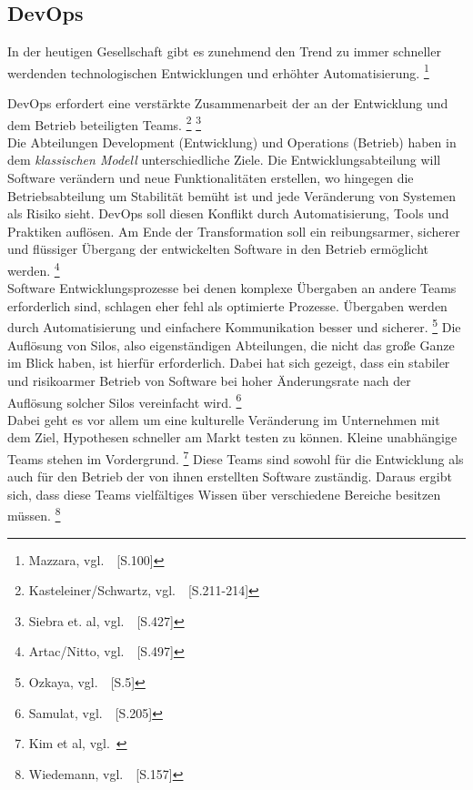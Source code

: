 \subsection{DevOps}\label{devops}

In der heutigen Gesellschaft gibt es zunehmend den Trend zu immer
schneller werdenden technologischen Entwicklungen und erhöhter Automatisierung. \footnote{Mazzara, vgl.~\cite{Mazzara2019}~[S.100]}

DevOps erfordert eine verstärkte Zusammenarbeit der an der Entwicklung und dem Betrieb beteiligten Teams.
\footnote{Kasteleiner/Schwartz, vgl.~\cite{Kasteleiner2019}~[S.211-214]}
\footnote{Siebra et. al, vgl.~\cite{Siebra2019}~[S.427]} \\

Die Abteilungen Development (Entwicklung) und Operations (Betrieb) haben in dem \textsl{klassischen Modell} unterschiedliche Ziele.
Die Entwicklungsabteilung will Software verändern und neue Funktionalitäten erstellen,
wo hingegen die Betriebsabteilung um Stabilität bemüht ist und jede Veränderung von Systemen als Risiko sieht.
DevOps soll diesen Konflikt durch Automatisierung, Tools und Praktiken auflösen.
Am Ende der Transformation soll ein reibungsarmer, sicherer und flüssiger Übergang der entwickelten Software in den Betrieb ermöglicht werden.
\footnote{Artac/Nitto, vgl.~\cite{Artac2017}~[S.497]} \\

Software Entwicklungsprozesse bei denen komplexe Übergaben an andere Teams erforderlich sind, schlagen eher fehl als optimierte Prozesse.
Übergaben werden durch Automatisierung und einfachere Kommunikation besser und sicherer. \footnote{Ozkaya, vgl.~\cite{Ozkaya2019}~[S.5]}
Die Auflösung von Silos, also eigenständigen Abteilungen, die nicht das große Ganze im Blick haben, ist hierfür erforderlich.
Dabei hat sich gezeigt, dass ein stabiler und risikoarmer Betrieb von Software bei hoher Änderungsrate nach der Auflösung solcher Silos vereinfacht wird.
\footnote{Samulat, vgl.~\cite{Samulat2017}~[S.205]} \\

Dabei geht es vor allem um eine kulturelle Veränderung im Unternehmen
mit dem Ziel, Hypothesen schneller am Markt testen zu können.
Kleine unabhängige Teams stehen im Vordergrund. \footnote{Kim et al, vgl.~\cite{Kim2018}}
Diese Teams sind sowohl für die Entwicklung als auch für den Betrieb der von ihnen erstellten Software zuständig.
Daraus ergibt sich, dass diese Teams vielfältiges Wissen über verschiedene Bereiche besitzen müssen.
\footnote{Wiedemann, vgl.~\cite{Wiedemann2019}~[S.157]} \\

